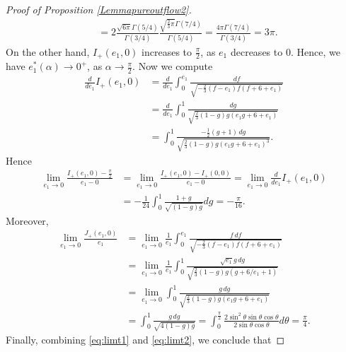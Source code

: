 \documentclass[reqno,12pt]{amsart}
\begin{document}
\begin{proof} [Proof of Proposition \ref{Lemmapureoutflow2}]
\begin{align*}
   &=  2\frac{\sqrt{6\pi}  \Gamma(5/4) }{  \Gamma(3/4) }\frac{\sqrt{\frac{2}{3}\pi}  \Gamma(7/4) }{  \Gamma(5/4) }=
    \frac{4\pi \Gamma(7/4) }{  \Gamma(3/4) }   = 3\pi.
\end{align*}
On the other hand, $I_{+}(e_1, 0)$ increases to $\frac{\pi}{2}$, as $e_1$ decreases to $0$. Hence, we  have $e_1^*(\alpha) \to 0^+$, as   $\alpha\to \frac{\pi}{2}$. 
Now we compute
\begin{align*}
    \frac{d}{de_1} I_{+}(e_1, 0) & =\frac{d}{de_1} \int_0^{e_1} 
    \frac{df}{\sqrt{-\frac23(f-e_1)f(f+6+e_1 )}}  \\
    & = \frac{d}{de_1} \int_0^1 \frac{dg}{\sqrt{\frac23 (1-g)g(e_1 g+6+e_1)}} \\
    &= \int_0^1 \frac{-\frac12 (g+1)\, dg}{\sqrt{\frac23 (1-g)g (e_1 g + 6+ e_1)^3}}. 
\end{align*}
Hence
\begin{equation}\label{eq:limt1}
\begin{aligned}
     \lim_{e_1\to 0}  \frac{I_{+}(e_1, 0)-\frac{\pi}{2}}{e_1 -0}&= \lim_{e_1\to 0}  \frac{I_{+}(e_1, 0)-I_+(0,0)}{e_1 -0}= \lim_{e_1\to 0} \frac{d}{de_1} I_{+}(e_1, 0) \\
     &= -\frac{1}{24} \int_{0}^{1}\frac{1+g}{\sqrt{(1-g)g}} dg
    = - \frac{\pi}{16}.
\end{aligned}
\end{equation}
Moreover,
\begin{equation}\label{eq:limt2}
\begin{aligned}
  \lim_{e_1\to 0}   \frac{J_{+}(e_1, 0)}{e_1}  &=  \lim_{e_1\to 0}\frac{1}{e_1}\int_0^{e_1} \frac{f\, df }{\sqrt{-\frac23 (f - e_1) f (f+ 6 + e_1)}}  \\
  &= \lim_{e_1\to 0}\frac{1}{e_1}\int_0^1 \frac{\sqrt{e_1} g \, dg }{\sqrt{\frac23(1-g) g (g+ 6/e_1 + 1)}} \\
  &= \lim_{e_1\to 0}\int_0^1 \frac{g \, dg }{\sqrt{\frac23(1-g) g (e_1g+ 6 + e_1)}} \\
  &=\int_0^1 \frac{g \, dg }{\sqrt{4(1-g) g }} =\int_0^{\frac{\pi}{2}} \frac{2\sin^2\theta \sin\theta \cos \theta}{2\sin\theta \cos\theta} d \theta =\frac{\pi}{4}.
\end{aligned}
\end{equation}
Finally, combining \eqref{eq:limt1} and \eqref{eq:limt2}, we conclude that 

\end{proof}
\end{document}
